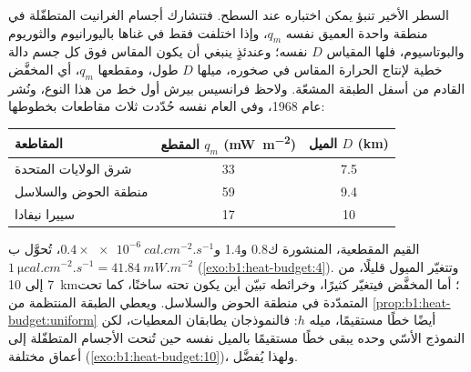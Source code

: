 السطر الأخير تنبؤ يمكن اختباره عند السطح. فتتشارك أجسام الغرانيت المتطفّلة في منطقة واحدة  العميق نفسه $q_m$، وإذا اختلفت فقط في غناها باليورانيوم والثوريوم والبوتاسيوم، فلها المقياس $D$ نفسه؛ وعندئذٍ ينبغي أن يكون  المقاس فوق كل جسم دالة خطية لإنتاج الحرارة المقاس في صخوره، ميلها $D$ طول، ومقطعها $q_m$، أي  المخفَّض القادم من أسفل الطبقة المشعّة. ولاحظ فرانسيس بيرش أول خط من هذا النوع، ونُشر عام 1968، وفي العام نفسه حُدّدت ثلاث مقاطعات بخطوطها:
\begin{center}
\small
\begin{tabular}{lcc}
\hline
المقاطعة & المقطع $q_m$ (\unit{mW.m^{-2}}) & الميل $D$ (\unit{km}) \\
\hline
شرق الولايات المتحدة & 33 & 7.5 \\
منطقة الحوض والسلاسل & 59 & 9.4 \\
سييرا نيفادا & 17 & 10 \\
\hline
\end{tabular}
\end{center}
القيم المقطعية، المنشورة ك\num{0.8} و\num{1.4} و$0.4\times\qty{e-6}{cal.cm^{-2}.s^{-1}}$، تُحوَّل ب$\qty{1}{\micro cal.cm^{-2}.s^{-1}} = \qty{41.84}{mW.m^{-2}}$ (\cref{exo:b1:heat-budget:4}). وتتغيّر الميول قليلًا، من 7 إلى \qty{10}{km}؛ أما  المخفَّض فيتغيّر كثيرًا، وخرائطه تبيّن أين يكون  تحته ساخنًا، كما تحت  المتمدّدة في منطقة الحوض والسلاسل. ويعطي الطبقة المنتظمة من \cref{prop:b1:heat-budget:uniform} أيضًا خطًا مستقيمًا، ميله $h$: فالنموذجان يطابقان المعطيات، لكن النموذج الأسّي وحده يبقى خطًا مستقيمًا بالميل نفسه حين تُنحت الأجسام المتطفّلة إلى أعماق مختلفة (\cref{exo:b1:heat-budget:10})، ولهذا يُفضَّل.

